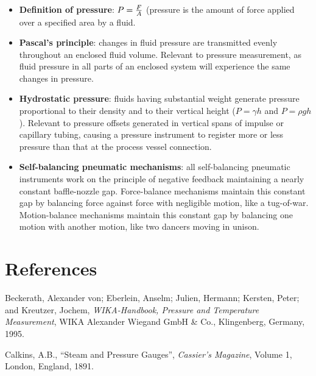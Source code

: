 \begin{itemize}
\item \textbf{Definition of pressure}: $P = {F \over A}$ (pressure is the amount of force applied over a specified area by a fluid.
\item \textbf{Pascal's principle}: changes in fluid pressure are transmitted evenly throughout an enclosed fluid volume.  Relevant to pressure measurement, as fluid pressure in all parts of an enclosed system will experience the same changes in pressure.
\item \textbf{Hydrostatic pressure}: fluids having substantial weight generate pressure proportional to their density and to their vertical height ($P = \gamma h$ and $P = \rho g h$).  Relevant to pressure offsets generated in vertical spans of impulse or capillary tubing, causing a pressure instrument to register more or less pressure than that at the process vessel connection.
\item \textbf{Self-balancing pneumatic mechanisms}: all self-balancing pneumatic instruments work on the principle of negative feedback maintaining a nearly constant baffle-nozzle gap.  Force-balance mechanisms maintain this constant gap by balancing force against force with negligible motion, like a tug-of-war.  Motion-balance mechanisms maintain this constant gap by balancing one motion with another motion, like two dancers moving in unison.
\end{itemize}










\filbreak
\section*{References}


\noindent
Beckerath, Alexander von; Eberlein, Anselm; Julien, Hermann; Kersten, Peter; and Kreutzer, Jochem, \textit{WIKA-Handbook, Pressure and Temperature Measurement}, WIKA Alexander Wiegand GmbH \& Co., Klingenberg, Germany, 1995.

\vskip 10pt

\noindent
Calkins, A.B., ``Steam and Pressure Gauges'', \textit{Cassier's Magazine}, Volume 1, London, England, 1891.

